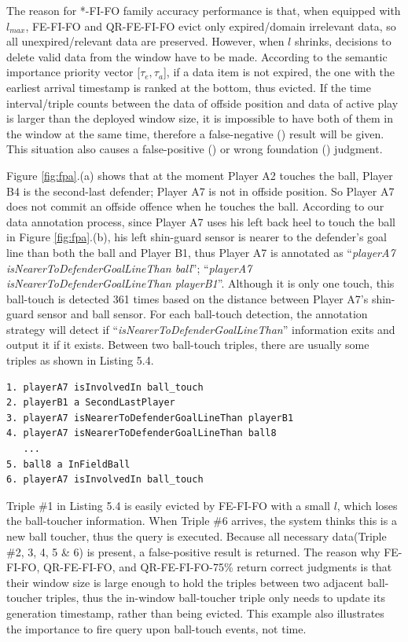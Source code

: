 The reason for *-FI-FO family accuracy performance is that, when equipped with $l_{max}$, FE-FI-FO and QR-FE-FI-FO evict only expired\slash domain irrelevant data, so all unexpired\slash relevant data are preserved.
However, when $l$ shrinks, decisions to delete valid data from the window have to be made. 
According to the semantic importance priority vector [$\tau_{e}, \tau_{a}$], if a data item is not expired, the one with the earliest arrival timestamp is ranked at the bottom, thus evicted. 
If the time interval/triple counts between the data of offside position and data of active play is larger than the deployed window size, it is impossible to have both of them in the window at the same time, therefore a false-negative (\textcolor{red}{\texttimes}) result will be given.
This situation also causes a false-positive (\textcolor{red}{\newmoon}) or wrong foundation (\textcolor{red}{\fullmoon}) judgment. 

Figure \ref{fig:fpa}.(a) shows that at the moment Player A2 touches the ball, Player B4 is the second-last defender; Player A7 is not in offside position.
So Player A7 does not commit an offside offence when he touches the ball.
According to our data annotation process, since Player A7 uses his left back heel to touch the ball in Figure \ref{fig:fpa}.(b), his left shin-guard sensor is nearer to the defender's goal line than both the ball and Player B1, thus Player A7 is annotated as ``\textit{playerA7 isNearerToDefenderGoalLineThan ball}''; ``\textit{playerA7 isNearerToDefenderGoalLineThan playerB1}''.
Although it is only one touch, this ball-touch is detected 361 times based on the distance between Player A7's shin-guard sensor and ball sensor.
For each ball-touch detection, the annotation strategy will detect if ``\textit{isNearerToDefenderGoalLineThan}'' information exits and output it if it exists.
Between two ball-touch triples, there are usually some triples as shown in Listing 5.4. 

\begin{lstlisting}[caption={\textbf{Ball Touch Annotation}},basicstyle=\small]
1. playerA7 isInvolvedIn ball_touch
2. playerB1 a SecondLastPlayer
3. playerA7 isNearerToDefenderGoalLineThan playerB1
4. playerA7 isNearerToDefenderGoalLineThan ball8
   ...
5. ball8 a InFieldBall
6. playerA7 isInvolvedIn ball_touch
\end{lstlisting}

Triple \#1 in Listing 5.4 is easily evicted by FE-FI-FO with a small $l$, which loses the ball-toucher information.
When Triple \#6 arrives, the system thinks this is a new ball toucher, thus the query is executed.
Because all necessary data(Triple \#2, 3, 4, 5 \& 6) is present, a false-positive result is returned.
The reason why FE-FI-FO, QR-FE-FI-FO, and QR-FE-FI-FO-75\% return correct judgments is that their window size is large enough to hold the triples between two adjacent ball-toucher triples, thus the in-window ball-toucher triple only needs to update its generation timestamp, rather than being evicted.
This example also illustrates the importance to fire query upon ball-touch events, not time. 

